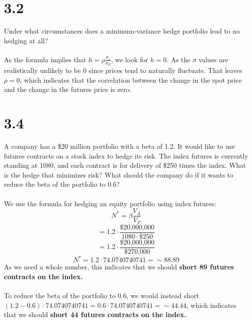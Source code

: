 \documentclass{article}
\begin{document}
\thispagestyle{firstpageheader}
{\Large 

\section*{3.2}

Under what circumstances does a minimum-variance hedge portfolio lead to no hedging at all? \\ \\ 
As the formula implies that \(h = \rho \frac{\sigma_s}{\sigma_F}\), we look for \(h = 0\). As the \(\sigma\) values are realistically unlikely to be 0 since prices tend to naturally fluctuate. That leaves \(\rho = 0\), which indicates that the correlation between the change in the spot price and the change in the futures price is zero.

}
{\Large 

\section*{3.4}

A company has a \$20 million portfolio with a beta of 1.2. It would like to use futures contracts on a stock index to hedge its risk. The index futures is currently standing at 1080, and each contract is for delivery of \$250 times the index. What is the hedge that minimizes risk? What should the company do if it wants to reduce the beta of the portfolio to 0.6? \\ \\
We use the formula for hedging an equity portfolio using index futures:
\[
  N^* = \beta \frac{V_A}{V_F}
\]
\[
  = 1.2 \cdot \frac{\text{\$20,000,000}}{1080 \cdot \text{\$250}}
\]
\[
  = 1.2 \cdot \frac{\text{\$20,000,000}}{\text{\$270,000}}
\]
\[
  N^* = 1.2 \cdot 74.0740740741 = \sim 88.89
\]
As we need a whole number, this indicates that we should \textbf{short 89 futures contracts on the index.} \\ \\
To reduce the beta of the portfolio to 0.6, we would instead short \((1.2 - 0.6) \cdot 74.0740740741 = 0.6 \cdot 74.0740740741 = \sim 44.44 \), which indicates that we should \textbf{short 44 futures contracts on the index.}

}
\end{document}
